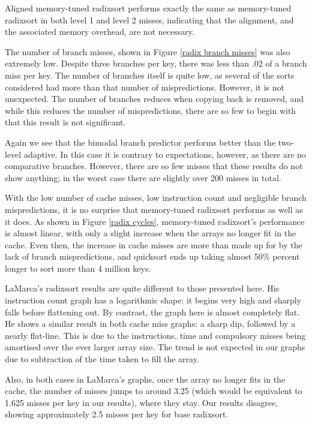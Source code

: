 Aligned memory-tuned radixsort performs exactly the same as memory-tuned
radixsort in both level 1 and level 2 misses, indicating that the alignment, and
the associated memory overhead, are not necessary.

The number of branch misses, shown in Figure \ref{radix branch misses} was also
extremely low. Despite three branches per key, there was less than .02 of a branch
miss per key. The number of branches itself is quite low, as several of the
sorts considered had more than that number of mispredictions. However, it is not
unexpected. The number of branches reduces when copying back is removed, and
while this reduces the number of mispredictions, there are so few to begin with
that this result is not significant.

Again we see that the bimodal branch predictor performs better than the
two-level adaptive. In this case it is contrary to expectations, however, as
there are no comparative branches. However, there are so few misses that these
results do not show anything; in the worst case there are slightly over 200
misses in total.

With the low number of cache misses, low instruction count and negligible branch
mispredictions, it is no surprise that memory-tuned radixsort performs as well as it
does. As shown in Figure \ref{radix cycles}, memory-tuned radixsort's performance is
almost linear, with only a slight increase when the arrays no longer fit in the
cache. Even then, the increase in cache misses are more than made up for by the
lack of branch mispredictions, and quicksort ends up taking almost 50\% percent
longer to sort more than 4 million keys.

LaMarca's radixsort results are quite different to those presented here. His
instruction count graph has a logarithmic shape: it begins very high and sharply
falls before flattening out. By contrast, the graph here is almost completely
flat. He shows a similar result in both cache miss graphs: a sharp dip, followed
by a nearly flat-line. This is due to the instructions, time and compulsory
misses being amortised over the ever larger array size. The trend is not
expected in our graphs due to subtraction of the time taken to fill the array.

Also, in both cases in LaMarca's graphs, once the array no longer fits in the
cache, the number of misses jumps to around 3.25 (which would be equivalent to
1.625 misses per key in our results), where they stay. Our results
disagree, showing approximately 2.5 misses per key for base radixsort.

